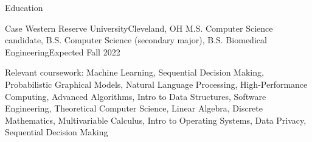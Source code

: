 \begin{rsection}{Education}
\begin{ritemize}
{Case Western Reserve University}{Cleveland, OH}
{M.S. Computer Science candidate, B.S. Computer Science (secondary major), B.S. Biomedical Engineering}{Expected Fall 2022}
	\item Relevant coursework:
	Machine Learning,
	Sequential Decision Making,
	Probabilistic Graphical Models,
	Natural Language Processing,
	High-Performance Computing,
	Advanced Algorithms,
	Intro to Data Structures,
	Software Engineering,
	Theoretical Computer Science,
	Linear Algebra,
	Discrete Mathematics,
	Multivariable Calculus,
	Intro to Operating Systems,
	Data Privacy,
	Sequential Decision Making
\end{ritemize}
\end{rsection}